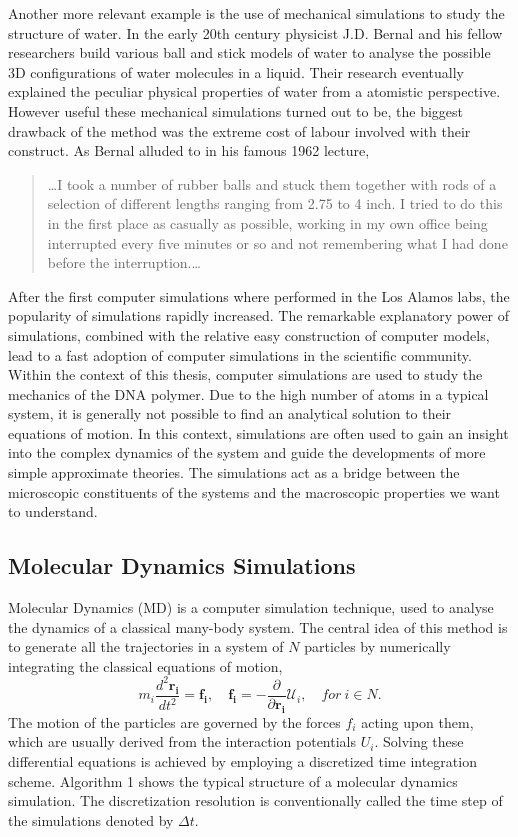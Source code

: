 Another more relevant example is the use of mechanical simulations to study the
structure of water.  In the early 20th century physicist J.D. Bernal and his fellow
researchers build various ball and stick models of water to analyse the possible 3D
configurations of water molecules in a liquid. Their research eventually explained the
peculiar physical properties of water from a atomistic perspective. However useful these
mechanical simulations turned out to be, the biggest drawback of the method was the
extreme cost of labour involved with their construct. As Bernal alluded to in his
famous 1962 lecture,

\begin{quote}
\dots I took a number of rubber balls and stuck them together with rods of a
selection of different lengths ranging from 2.75 to 4 inch. I tried to do this in the
first place as casually as possible, working in my own office being interrupted every
five minutes or so and not remembering what I had done before the interruption.\dots
\end{quote}

After the first computer simulations where performed in the Los Alamos labs, the
popularity of simulations rapidly increased. The remarkable explanatory power of
simulations, combined with the relative easy construction of computer models, lead to a
fast adoption of computer simulations in the scientific community. Within the context of
this thesis, computer simulations are used to study the mechanics of
the DNA polymer. Due to the high number of atoms in a typical system, it is generally
not possible to find an analytical solution to their equations of motion. In this
context, simulations are often used to gain an insight into the complex dynamics of the
system and guide the developments of more simple approximate theories. The simulations
act as a bridge between the microscopic constituents of the systems and the macroscopic
properties we want to understand.


\subsection{Molecular Dynamics Simulations}
Molecular Dynamics (MD) is a computer simulation technique, used to analyse
the dynamics of a classical many-body system. The central idea of this method is to
generate all the trajectories in a system of $N$ particles by numerically
integrating the classical equations of motion,
\[
m_i \frac{d^2 \boldsymbol{r_i}}{dt^2} = \boldsymbol{f_i}, \quad \boldsymbol{f_i} = -
    \frac{\partial}{\partial \boldsymbol{r_i}} \mathcal{U}_i, \quad for\ i \in N.
\]
The motion of the particles are governed by the forces $f_i$ acting upon them, which are
usually derived from the interaction potentials $U_i$.
Solving these differential equations is achieved by employing a discretized time
integration scheme.  Algorithm 1 shows the typical structure of a molecular dynamics
simulation. The discretization resolution is conventionally called the time step of the
simulations denoted by $\Delta t$.\\

